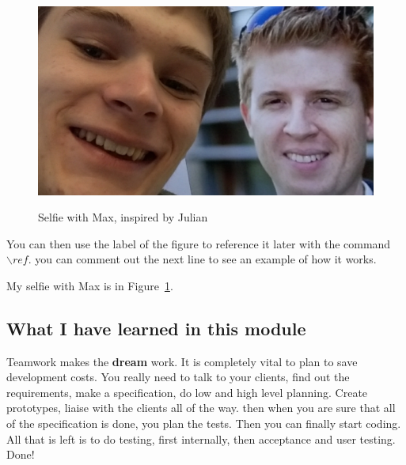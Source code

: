 \begin{figure}[h]
\caption{Selfie with Max, inspired by Julian}
\centering
\includegraphics[width=1.0\textwidth]{maxSelfieJoshua.jpg}
\label{fig:selfie}
\end{figure}

You can then use the label of the figure to reference it later with the command ${\backslash}ref$. you can comment out the next line to see an example of how it works.

My selfie with Max is in  Figure~\ref{fig:selfie}.

\subsection{What I have learned in this module}

Teamwork makes the \textbf{dream} work. It is completely vital to plan to save development costs. You really need to talk to your clients, find out the requirements, make a specification, do low and high level planning. Create prototypes, liaise with the clients all of the way. then when you are sure that all of the specification is done, you plan the tests. Then you can finally start coding. All that is left is to do testing, first internally, then acceptance and user testing. Done!
